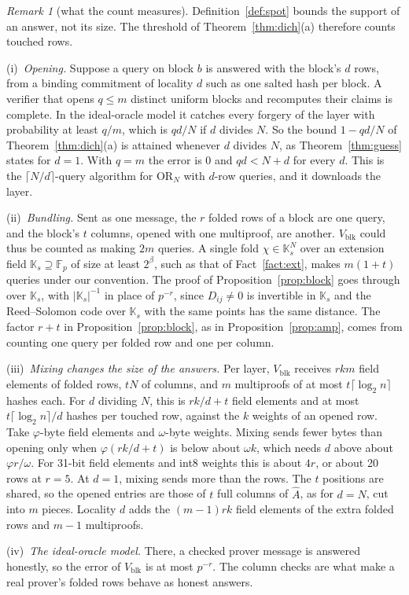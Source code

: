 \documentclass[conference,compsoc]{IEEEtran}
\newcommand{\F}{\mathbb{F}_p}
\theoremstyle{plain}
\theoremstyle{definition}
\theoremstyle{remark}
\newtheorem{remark}{Remark}
\begin{document}
\begin{remark}[what the count measures]
\label{rem:block-count}
Definition~\ref{def:spot} bounds the support of an answer, not its size. The threshold of
Theorem~\ref{thm:dich}(a) therefore counts touched rows.

(i)~\emph{Opening.} Suppose a query on block $b$ is answered with the block's $d$ rows, from a binding
commitment of locality $d$ such as one salted hash per block. A verifier that opens $q\le m$ distinct
uniform blocks and recomputes their claims is complete. In the ideal-oracle model it catches every
forgery of the layer with probability at least $q/m$, which is $qd/N$ if $d$ divides $N$. So the bound
$1-qd/N$ of Theorem~\ref{thm:dich}(a) is attained whenever $d$ divides $N$, as Theorem~\ref{thm:guess}
states for $d=1$. With $q=m$ the error is $0$ and $qd<N+d$ for every $d$. This is the $\lceil N/d\rceil$-query algorithm for
$\mathrm{OR}_N$ with $d$-row queries, and it downloads the layer.

(ii)~\emph{Bundling.} Sent as one message, the $r$ folded rows of a block are one query, and the
block's $t$ columns, opened with one multiproof, are another. $V_{\mathrm{blk}}$ could thus be counted
as making $2m$ queries. A single fold $\chi\in\mathbb K_s^N$ over an extension field
$\mathbb K_s\supseteq\F$ of size at least $2^\beta$, such as that of Fact~\ref{fact:ext}, makes
$m(1+t)$ queries under our convention. The proof of Proposition~\ref{prop:block} goes through over
$\mathbb K_s$, with $|\mathbb K_s|^{-1}$ in place of $p^{-r}$, since $D_{ij}\neq0$ is invertible in
$\mathbb K_s$ and the Reed--Solomon code over $\mathbb K_s$ with the same points has the same
distance. The
factor $r+t$ in Proposition~\ref{prop:block}, as in Proposition~\ref{prop:amp}, comes from counting
one query per folded row and one per column.

(iii)~\emph{Mixing changes the size of the answers.} Per layer, $V_{\mathrm{blk}}$ receives $rkm$
field elements of folded rows, $tN$ of columns, and $m$ multiproofs of at most $t\lceil\log_2n\rceil$
hashes each. For $d$ dividing $N$, this is $rk/d+t$ field elements and at most
$t\lceil\log_2n\rceil/d$ hashes per touched row, against the $k$ weights of an opened row. Take
$\varphi$-byte field elements and $\omega$-byte weights. Mixing sends fewer bytes than opening only
when $\varphi(rk/d+t)$ is below about $\omega k$, which needs $d$ above about $\varphi r/\omega$. For
31-bit field elements and int8 weights this is about $4r$, or about 20 rows at $r=5$. At $d=1$,
mixing sends more than the rows. The $t$ positions are shared, so the opened entries are those of $t$
full columns of $\hat A$, as for $d=N$, cut into $m$ pieces. Locality $d$ adds the $(m-1)rk$ field
elements of the extra folded rows and $m-1$ multiproofs.

(iv)~\emph{The ideal-oracle model.} There, a checked prover message is answered honestly, so the
error of $V_{\mathrm{blk}}$ is at most $p^{-r}$. The column checks are what make a real prover's
folded rows behave as honest answers.
\end{remark}
\end{document}
